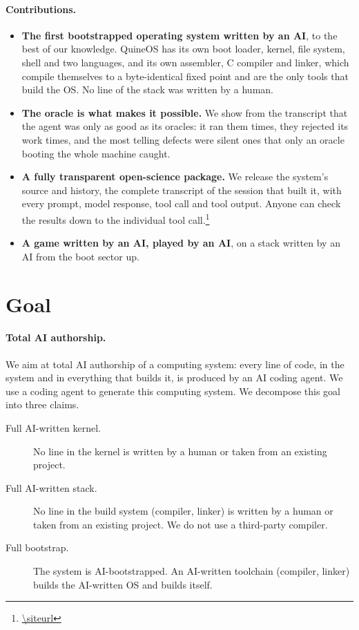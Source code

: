 \documentclass{article}
\newcommand{\sysname}{QuineOS}
\begin{document}
\paragraph{Contributions.}
\begin{itemize}
  \item \textbf{The first bootstrapped operating system written by an AI}, to the best of
        our knowledge. \sysname{} has its own boot loader, kernel, file system, shell and
        two languages, and its own assembler, C compiler and linker, which compile
        themselves to a byte-identical fixed point and are the only tools that build the
        OS. No line of the stack was written by a human.

  \item \textbf{The oracle is what makes it possible.} We show from the
        transcript that the agent was only as good as its oracles: it ran them
        \noraclesruns{} times, they rejected its work \noraclesfailed{} times, and the
        most telling defects were silent ones that only an oracle booting the whole
        machine caught.
  \item \textbf{A fully transparent open-science package.} We release the system's
        source and history, the complete transcript of the session that built it, with
        every prompt, model response, tool call and tool output. Anyone can
        check the results down to the individual tool call.\footnote{\url{\siteurl}}
  \item \textbf{A game written by an AI, played by an AI}, on a stack written by an AI from the boot sector up.
\end{itemize}


\section{Goal}\label{sec:goal}

\paragraph{Total AI authorship.} We aim at total AI authorship of a computing system: every line of
code, in the system and in everything that builds it, is produced by an AI coding agent.
We use a coding agent to generate this computing system.
We decompose this goal into three claims.
\begin{description}
  \item[Full AI-written kernel.] No line in the kernel is written by
        a human or taken from an existing project.
  \item[Full AI-written stack.] No line in the build system (compiler, linker) is written by
        a human or taken from an existing project. We do not use a third-party compiler.
  \item[Full bootstrap.] The system is AI-bootstrapped. An AI-written toolchain (compiler, linker) builds the AI-written OS and builds itself.
\end{description}
\end{document}
